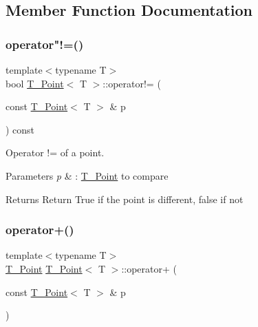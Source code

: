 \subsection{Member Function Documentation}
\mbox{\label{classT__Point_ab92f1605c6f5008b42105b4c7a7fc1b2}} 
\subsubsection{\texorpdfstring{operator"!=()}{operator!=()}}
{\footnotesize\ttfamily template$<$typename T$>$ \\
bool \hyperlink{classT__Point}{T\+\_\+\+Point}$<$ T $>$\+::operator!= (\begin{DoxyParamCaption}\item[{const \hyperlink{classT__Point}{T\+\_\+\+Point}$<$ T $>$ \&}]{p }\end{DoxyParamCaption}) const\hspace{0.3cm}{\ttfamily [inline]}}



Operator != of a point. 


\begin{DoxyParams}{Parameters}
{\em p} & \+: \hyperlink{classT__Point}{T\+\_\+\+Point} to compare \\
\hline
\end{DoxyParams}
\begin{DoxyReturn}{Returns}
Return True if the point is different, false if not 
\end{DoxyReturn}
\mbox{\label{classT__Point_a1f94a7a19cc8711e7784f700ea59297a}} 
\subsubsection{\texorpdfstring{operator+()}{operator+()}}
{\footnotesize\ttfamily template$<$typename T$>$ \\
\hyperlink{classT__Point}{T\+\_\+\+Point} \hyperlink{classT__Point}{T\+\_\+\+Point}$<$ T $>$\+::operator+ (\begin{DoxyParamCaption}\item[{const \hyperlink{classT__Point}{T\+\_\+\+Point}$<$ T $>$ \&}]{p }\end{DoxyParamCaption})\hspace{0.3cm}{\ttfamily [inline]}}

